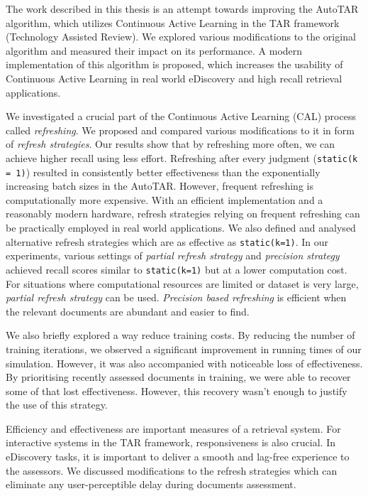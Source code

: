 \label{chap:conclusion}
The work described in this thesis is an attempt towards improving the AutoTAR
algorithm, which utilizes Continuous Active Learning in the TAR framework
(Technology Assisted Review). We explored various modifications to the original
algorithm and measured their impact on its performance. A modern implementation
of this algorithm is proposed, which increases the usability of Continuous Active
Learning in real world eDiscovery and high recall retrieval applications.

We investigated a crucial part of the Continuous Active Learning (CAL) process
called \textit{refreshing}. We proposed and compared various modifications to it
in form of \textit{refresh strategies}. Our results show that by refreshing more
often, we can achieve higher recall using less effort. Refreshing after every
judgment (\texttt{static(k = 1)}) resulted in consistently better effectiveness
than the exponentially increasing batch sizes in the AutoTAR. However, frequent
refreshing is computationally more expensive. With an efficient implementation
and a reasonably modern hardware, refresh strategies relying on frequent
refreshing can be practically employed in real world applications.  We also
defined and analysed alternative refresh strategies which are as effective as
\texttt{static(k=1)}.  In our experiments, various settings of \textit{partial
refresh strategy} and \textit{precision strategy} achieved recall scores similar
to \texttt{static(k=1)} but at a lower computation cost. For situations where
computational resources are limited or dataset is very large, \textit{partial
refresh strategy} can be used.  \textit{Precision based refreshing} is efficient
when the relevant documents are abundant and easier to find.

We also briefly explored a way reduce training costs. By reducing the number
of training iterations, we observed a significant improvement in running times
of our simulation. However, it was also accompanied with noticeable loss of
effectiveness. By prioritising recently assessed documents in training, we were
able to recover some of that lost effectiveness. However, this recovery wasn't
enough to justify the use of this strategy.

Efficiency and effectiveness are important measures of a retrieval system. For
interactive systems in the TAR framework, responsiveness is also crucial. In
eDiscovery tasks, it is important to deliver a smooth and lag-free experience to
the assessors. We discussed modifications to the refresh strategies which can
eliminate any user-perceptible delay during documents assessment.

